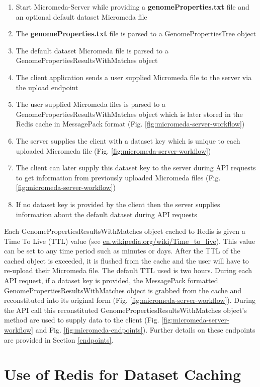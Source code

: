 \begin{enumerate}
  \item Start Micromeda-Server while providing a \textbf{genomeProperties.txt} file and an optional default dataset Micromeda file
  \item The \textbf{genomeProperties.txt} file is parsed to a GenomePropertiesTree object
  \item The default dataset Micromeda file is parsed to a GenomePropertiesResultsWithMatches object
  \item The client application sends a user supplied Micromeda file to the server via the upload endpoint
  \item The user supplied Micromeda files is parsed to a GenomePropertiesResultsWithMatches object which is later stored in the Redis cache in MessagePack format (Fig. \ref{fig:micromeda-server-workflow})
  \item The server supplies the client with a dataset key which is unique to each uploaded Micromeda file (Fig. \ref{fig:micromeda-server-workflow})
  \item The client can later supply this dataset key to the server during API requests to get information from previously uploaded Micromeda files (Fig. \ref{fig:micromeda-server-workflow})
  \item If no dataset key is provided by the client then the server supplies information about the default dataset during API requests
\end{enumerate}

Each GenomePropertiesResultsWithMatches object cached to Redis is given a Time To Live (TTL) value \cite{gwertzman1996world} (see \href{en.wikipedia.org/wiki/Time\_to\_live}{en.wikipedia.org/wiki/Time\_to\_live}). This value can be set to any time period such as minutes or days. After the TTL of the cached object is exceeded, it is flushed from the cache and the user will have to re-upload their Micromeda file. The default TTL used is two hours. During each API request, if a dataset key is provided, the MessagePack formatted GenomePropertiesResultsWithMatches object is grabbed from the cache and reconstituted into its original form (Fig. \ref{fig:micromeda-server-workflow}). During the API call this reconstituted GenomePropertiesResultsWithMatches object's method are used to supply data to the client  (Fig. \ref{fig:micromeda-server-workflow} and Fig. \ref{fig:micromeda-endpoints}). Further details on these endpoints are provided in Section \ref{endpoints}.

\section{Use of Redis for Dataset Caching} \label{redis-caching}

